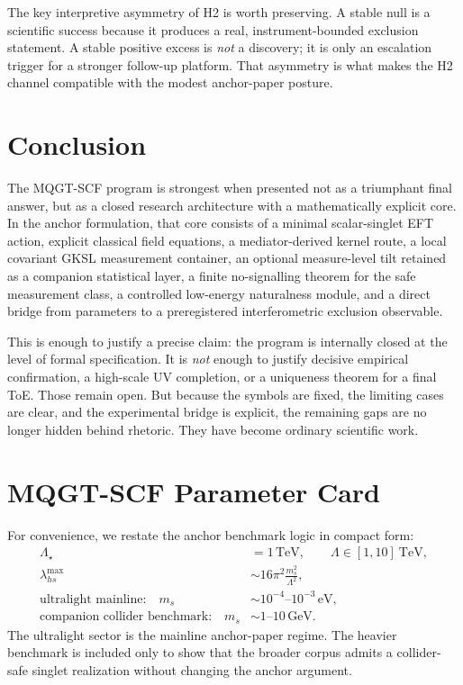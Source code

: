\documentclass[aps,prd,twocolumn,superscriptaddress,nofootinbib]{revtex4-2}
\begin{document}
The key interpretive asymmetry of H2 is worth preserving. A stable null is a scientific success because it produces a real, instrument-bounded exclusion statement. A stable positive excess is \emph{not} a discovery; it is only an escalation trigger for a stronger follow-up platform. That asymmetry is what makes the H2 channel compatible with the modest anchor-paper posture.

\section{Conclusion}
The MQGT-SCF program is strongest when presented not as a triumphant final answer, but as a closed research architecture with a mathematically explicit core. In the anchor formulation, that core consists of a minimal scalar-singlet EFT action, explicit classical field equations, a mediator-derived kernel route, a local covariant GKSL measurement container, an optional measure-level tilt retained as a companion statistical layer, a finite \mbox{no-signalling} theorem for the safe measurement class, a controlled low-energy naturalness module, and a direct bridge from parameters to a preregistered interferometric exclusion observable.

This is enough to justify a precise claim: the program is internally closed at the level of formal specification. It is \emph{not} enough to justify decisive empirical confirmation, a high-scale UV completion, or a uniqueness theorem for a final ToE. Those remain open. But because the symbols are fixed, the limiting cases are clear, and the experimental bridge is explicit, the remaining gaps are no longer hidden behind rhetoric. They have become ordinary scientific work.

\appendix

\section{MQGT-SCF Parameter Card}
For convenience, we restate the anchor benchmark logic in compact form:
\begin{align}
\Lambda_{\star} &= 1\,\mathrm{TeV},\qquad \Lambda\in[1,10]~\mathrm{TeV},\\
\lambda_{hs}^{\mathrm{max}} &\sim 16\pi^2\frac{m_s^2}{\Lambda^2},\\
\text{ultralight mainline:}\quad m_s &\sim 10^{-4}\text{--}10^{-3}\,\mathrm{eV},\\
\text{companion collider benchmark:}\quad m_s &\sim 1\text{--}10\,\mathrm{GeV}.
\end{align}
The ultralight sector is the mainline anchor-paper regime. The heavier benchmark is included only to show that the broader corpus admits a collider-safe singlet realization without changing the anchor argument.
\end{document}
